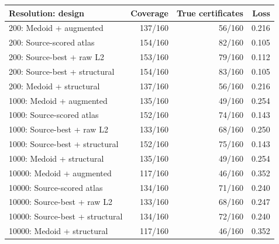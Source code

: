 \begin{tabular}{lrrr}
\toprule
Resolution: design & Coverage & True certificates & Loss \\
\midrule
200: Medoid + augmented & 137/160 & 56/160 & 0.216 \\
200: Source-scored atlas & 154/160 & 82/160 & 0.105 \\
200: Source-best + raw L2 & 153/160 & 79/160 & 0.112 \\
200: Source-best + structural & 154/160 & 83/160 & 0.105 \\
200: Medoid + structural & 137/160 & 56/160 & 0.216 \\
1000: Medoid + augmented & 135/160 & 49/160 & 0.254 \\
1000: Source-scored atlas & 152/160 & 74/160 & 0.143 \\
1000: Source-best + raw L2 & 133/160 & 68/160 & 0.250 \\
1000: Source-best + structural & 152/160 & 75/160 & 0.143 \\
1000: Medoid + structural & 135/160 & 49/160 & 0.254 \\
10000: Medoid + augmented & 117/160 & 46/160 & 0.352 \\
10000: Source-scored atlas & 134/160 & 71/160 & 0.240 \\
10000: Source-best + raw L2 & 133/160 & 68/160 & 0.247 \\
10000: Source-best + structural & 134/160 & 72/160 & 0.240 \\
10000: Medoid + structural & 117/160 & 46/160 & 0.352 \\
\bottomrule
\end{tabular}
